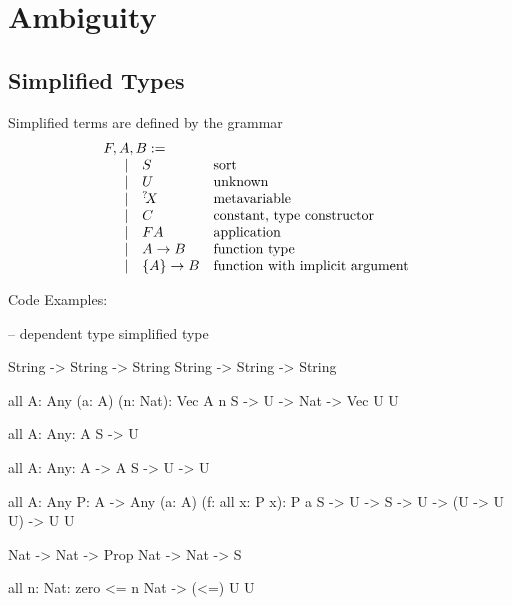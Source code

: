 \section{Ambiguity}




\subsection{Simplified Types}

Simplified terms are defined by the grammar
$$
\begin{array}{lllll} 
    F, A, B :=
    \\
    \quad
    \begin{array}{lllll} 
        \mid&
        S &\text{sort}
        \\
        \mid&
        U &\text{unknown}
        \\
        \mid&
        {{}^? \kern-0.2em X} &\text{metavariable}
        \\
        \mid&
        C &\text{constant, type constructor}
        \\
        \mid&
        F A &\text{application}
        \\
        \mid&
        A \to B &\text{function type}
        \\
        \mid&
        {\{A\}} \to B &\text{function with implicit argument}
     \end{array}
 \end{array}
$$


Code Examples:
\begin{alba}
    -- dependent type                       simplified type
 
    String -> String -> String              String -> String -> String

    all {A: Any} (a: A) (n: Nat): Vec A n   {S} -> U -> Nat -> Vec U U

    all {A: Any}: A                         {S} -> U

    all {A: Any}: A -> A                    {S} -> U -> U

    all {A: Any} {P: A -> Any} (a: A) (f: all x: P x): P a
                                            {S} -> {U -> S} -> U -> (U -> U U) -> U U

    Nat -> Nat -> Prop                      Nat -> Nat -> S

    all {n: Nat}: zero <= n                 {Nat} -> (<=) U U
\end{alba}

